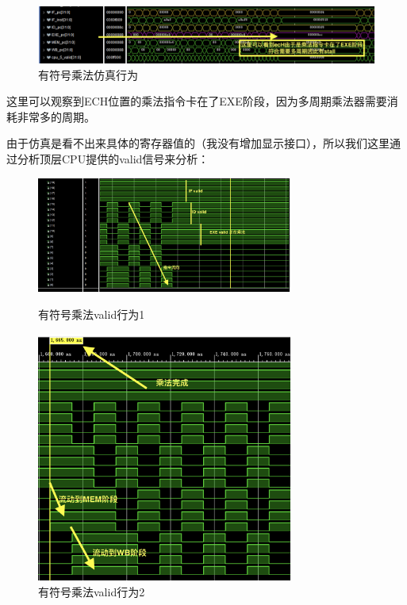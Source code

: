 \documentclass[a4paper]{article}
\begin{document}
\begin{figure}[H]
    \centering
    \includegraphics[width=\textwidth]{img/复现流水线仿真/多周期乘法卡在exe阶段.png}
    \caption{有符号乘法仿真行为}
\end{figure}

这里可以观察到ECH位置的乘法指令卡在了EXE阶段，因为多周期乘法器需要消耗非常多的周期。

由于仿真是看不出来具体的寄存器值的（我没有增加显示接口），所以我们这里通过分析顶层CPU提供的valid信号来分析：


\begin{figure}[H]
    \centering
    \includegraphics[width=0.75\textwidth]{img/复现流水线仿真/乘法valid行为.png}
    \caption{有符号乘法valid行为1}

    \centering
    \includegraphics[width=0.75\textwidth]{img/复现流水线仿真/乘法完成后.png}
    \caption{有符号乘法valid行为2}
\end{figure}
\end{document}
